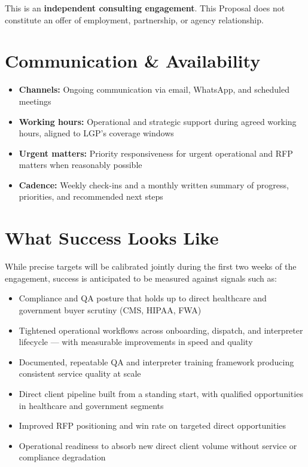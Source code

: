 \documentclass{proposal}
\begin{document}
\vspace{8pt}

\begin{clausebox}
\sffamily\small
This is an \textbf{independent consulting engagement}. This Proposal does not
constitute an offer of employment, partnership, or agency relationship.
\end{clausebox}

\section{Communication \& Availability}

\begin{itemize}[leftmargin=1.5em, itemsep=4pt, topsep=4pt]
  \item \textbf{Channels:} Ongoing communication via email, WhatsApp, and
        scheduled meetings
  \item \textbf{Working hours:} Operational and strategic support during
        agreed working hours, aligned to LGP's coverage windows
  \item \textbf{Urgent matters:} Priority responsiveness for urgent
        operational and RFP matters when reasonably possible
  \item \textbf{Cadence:} Weekly check-ins and a monthly written summary
        of progress, priorities, and recommended next steps
\end{itemize}

\section{What Success Looks Like}

While precise targets will be calibrated jointly during the first two weeks
of the engagement, success is anticipated to be measured against signals
such as:

\begin{itemize}[leftmargin=1.5em, itemsep=3pt, topsep=2pt]
  \item Compliance and QA posture that holds up to direct healthcare and
        government buyer scrutiny (CMS, HIPAA, FWA)
  \item Tightened operational workflows across onboarding, dispatch, and
        interpreter lifecycle --- with measurable improvements in speed
        and quality
  \item Documented, repeatable QA and interpreter training framework
        producing consistent service quality at scale
  \item Direct client pipeline built from a standing start, with
        qualified opportunities in healthcare and government segments
  \item Improved RFP positioning and win rate on targeted direct
        opportunities
  \item Operational readiness to absorb new direct client volume without
        service or compliance degradation
\end{itemize}
\end{document}
